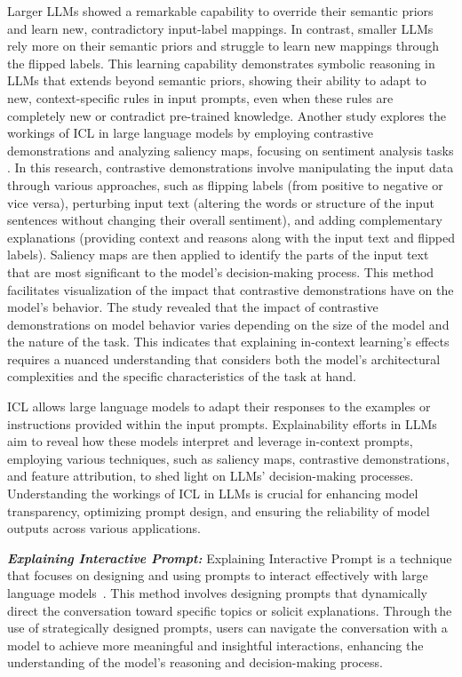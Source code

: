 \documentclass[final,5p,times,twocolumn]{elsarticle}
\begin{document}
Larger LLMs showed a remarkable capability to override their semantic priors and learn new, contradictory input-label mappings. In contrast, smaller LLMs rely more on their semantic priors and struggle to learn new mappings through the flipped labels. This learning capability demonstrates symbolic reasoning in LLMs that extends beyond semantic priors, showing their ability to adapt to new, context-specific rules in input prompts, even when these rules are completely new or contradict pre-trained knowledge. Another study explores the workings of ICL in large language models by employing contrastive demonstrations and analyzing saliency maps, focusing on sentiment analysis tasks \cite{li2023towards}. In this research, contrastive demonstrations involve manipulating the input data through various approaches, such as flipping labels (from positive to negative or vice versa), perturbing input text (altering the words or structure of the input sentences without changing their overall sentiment), and adding complementary explanations (providing context and reasons along with the input text and flipped labels). Saliency maps are then applied to identify the parts of the input text that are most significant to the model’s decision-making process. This method facilitates visualization of the impact that contrastive demonstrations have on the model’s behavior. The study revealed that the impact of contrastive demonstrations on model behavior varies depending on the size of the model and the nature of the task. This indicates that explaining in-context learning's effects requires a nuanced understanding that considers both the model's architectural complexities and the specific characteristics of the task at hand.

ICL allows large language models to adapt their responses to the examples or instructions provided within the input prompts. Explainability efforts in LLMs aim to reveal how these models interpret and leverage in-context prompts, employing various techniques, such as saliency maps, contrastive demonstrations, and feature attribution, to shed light on LLMs’ decision-making processes. Understanding the workings of ICL in LLMs is crucial for enhancing model transparency, optimizing prompt design, and ensuring the reliability of model outputs across various applications. 



\textbf{\textit{Explaining Interactive Prompt:}}
Explaining Interactive Prompt is a technique that focuses on designing and using prompts to interact effectively with large language models~\cite{white2023prompt,slack2023explaining}. This method involves designing prompts that dynamically direct the conversation toward specific topics or solicit explanations. Through the use of strategically designed prompts, users can navigate the conversation with a model to achieve more meaningful and insightful interactions, enhancing the understanding of the model's reasoning and decision-making process. 
\end{document}
